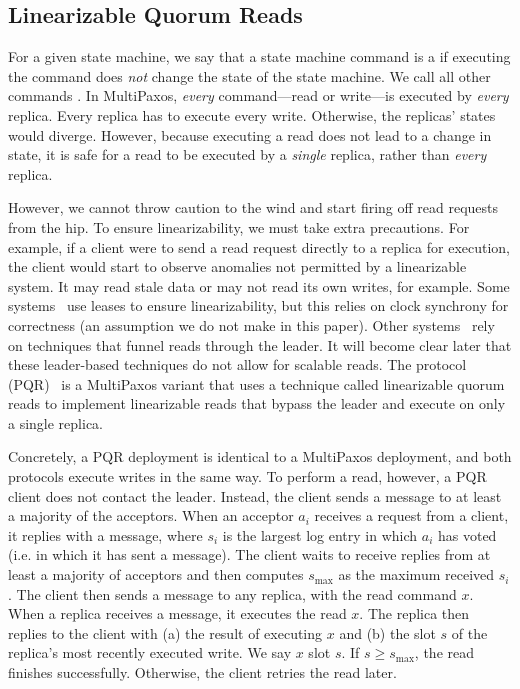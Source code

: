 {}

\subsection{Linearizable Quorum Reads}
For a given state machine, we say that a state machine command is a
 if executing the command does \emph{not} change the state of the
state machine. We call all other commands . In MultiPaxos,
\emph{every} command---read or write---is executed by \emph{every} replica.
Every replica has to execute every write.  Otherwise, the replicas' states
would diverge. However, because executing a read does not lead to a change in
state, it is safe for a read to be executed by a \emph{single} replica, rather
than \emph{every} replica.

However, we cannot throw caution to the wind and start firing off read requests
from the hip. To ensure linearizability, we must take extra precautions. For
example, if a client were to send a read request directly to a replica for
execution, the client would start to observe anomalies not permitted by a
linearizable system. It may read stale data or may not read its own writes, for
example.
%
Some systems~\cite{burrows2006chubby} use leases to ensure linearizability, but
this relies on clock synchrony for correctness (an assumption we do not make in
this paper). Other systems~\cite{bolosky2011paxos,ongaro2013search} rely on
techniques that funnel reads through the leader. It will become clear later
that these leader-based techniques do not allow for scalable reads.
%
The  protocol (PQR)~\cite{charapko2019linearizable}
is a MultiPaxos variant that uses a technique called linearizable quorum reads
to implement linearizable reads that bypass the leader and execute on only a
single replica.
%

Concretely, a PQR deployment is identical to a MultiPaxos deployment, and both
protocols execute writes in the same way. To perform a read, however, a PQR
client does not contact the leader. Instead, the client sends a
 message to at least a majority of the acceptors. When an
acceptor $a_i$ receives a  request from a client, it replies
with a  message, where $s_i$ is the largest log entry in
which $a_i$ has voted (i.e. in which it has sent a  message).
The client waits to receive  replies from at least a
majority of acceptors and then computes $s_\text{max}$ as the maximum received
$s_i$. The client then sends a  message to any replica, with the
read command $x$. When a replica receives a  message, it executes
the read $x$. The replica then replies to the client with (a) the result of
executing $x$ and (b) the slot $s$ of the replica's most recently executed
write. We say $x$  slot $s$. If $s \geq s_\text{max}$, the
read finishes successfully. Otherwise, the client retries the read later.

{}
